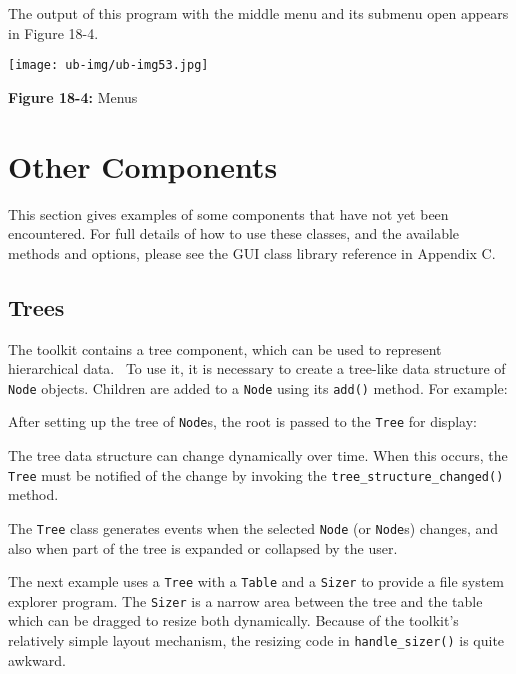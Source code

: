 The output of this program with the middle menu and its submenu open
appears in Figure 18-4.\\

\begin{center}
\texttt{[image: ub-img/ub-img53.jpg]}
\end{center}

{\sffamily\bfseries Figure 18-4:}
{\sffamily Menus}

\section{Other Components}

This section gives examples of some components that have not yet been
encountered. For full details of how to use these classes, and the
available methods and options, please see the GUI class library
reference in Appendix C.

\subsection{Trees}

The toolkit contains a tree component, which can be used to represent
hierarchical data. \ To use it, it is necessary to create a tree-like
data structure of \texttt{Node} objects. Children are added to a
\texttt{Node} using its \texttt{add()} method. For example:


After setting up the tree of \texttt{Node}s, the root is passed
to the \texttt{Tree} for display:


\noindent The tree data structure can change dynamically over time. When this
occurs, the \texttt{Tree} must be notified of the change by invoking
the \texttt{tree\_structure\_changed()} method.

The \texttt{Tree} class generates events when the selected \texttt{Node}
(or \texttt{Node}s) changes, and also when part of the tree is expanded
or collapsed by the user.

The next example uses a \texttt{Tree} with a \texttt{Table} and a
\texttt{Sizer} to provide a file system explorer program.
The \texttt{Sizer} is a narrow area between
the tree and the table which can be dragged to resize both dynamically.
Because of the toolkit's relatively simple layout
mechanism, the resizing code in \texttt{handle\_sizer()} is quite
awkward.



